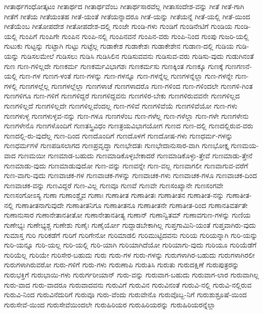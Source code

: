 {ಗೀತಾರ್ಥಗಂಧೋತ್ಕಟಂ
ಗೀತಾರ್ಥದ
ಗೀತಾರ್ಥವೆಂಬ
ಗೀತಾರ್ಥಸಾರವೆಲ್ಲ
ಗೀತಾಸಂದೇಶ-ವನ್ನು
ಗೀತೆ
ಗೀತೆ-ಗಾಗಿ
ಗೀತೆಗೆ
ಗೀತೆಯ
ಗೀತೆಯಂತಹ
ಗೀತೆ-ಯಂತೆ
ಗೀತೆಯನ್ನಾದರೂ
ಗೀತೆ-ಯನ್ನು
ಗೀತೆಯನ್ನೆ
ಗೀತೆ-ಯಲ್ಲಿ
ಗೀತೆ-ಯಿಂದ
ಗೀತೆಯೆಂಬ
ಗೀತೋಪದೇಶ
ಗೀತೋಪದೇಶ-ದಲ್ಲಿ
ಗುಂಜೇ
ಗುಂಡಿ-ಗಳು
ಗುಂಡಿಗೆ
ಗುಂಡಿನೇಟಿಗೆ
ಗುಂಡಿಯ
ಗುಂಡಿ-ಯಲ್ಲಿ
ಗುಂಪಿಗೆ
ಗುಂಪಿಗೇ
ಗುಂಪಿನ
ಗುಂಪಿ-ನಲ್ಲಿ
ಗುಂಪಿನವನೆ
ಗುಂಪಿನ-ವರು
ಗುಂಪಿ-ನಿಂದ
ಗುಂಪು
ಗುಜರಿ-ಯಲ್ಲಿ
ಗುಟುಕು
ಗುಟ್ಟನ್ನು
ಗುಟ್ಟಾಗಿ
ಗುಟ್ಟು
ಗುಟ್ಟೆಲ್ಲ
ಗುಡಾಕೇಶ
ಗುಡಾಕೇಶಃ
ಗುಡಾಕೇಶೇನ
ಗುಡಾಣ-ದಲ್ಲಿ
ಗುಡಿಯ
ಗುಡಿ-ಯನ್ನು
ಗುಡಿಸಲಮೇಲೆ
ಗುಡಿಸಲು
ಗುಡಿಸಿ
ಗುಡಿಸಿಲಿನ
ಗುಡಿಸುವವನು
ಗುಡಿಸುವ-ವರು
ಗುಡಿಸು-ವುದು
ಗುಡುಗಿನಂತೆ
ಗುಣ
ಗುಣ-ಗಳಿಲ್ಲದೇ
ಗುಣಕರ್ಮ
ಗುಣಕರ್ಮವಿಭಾಗಶಃ
ಗುಣಕರ್ಮಸು
ಗುಣಕ್ಕಿಂತ
ಗುಣಕ್ಕೂ
ಗುಣಕ್ಕೆ
ಗುಣಗಣನೆ-ಯಲ್ಲಿ
ಗುಣ-ಗಳ
ಗುಣಗ-ಳಂತೆ
ಗುಣ-ಗಳನ್ನು
ಗುಣ-ಗಳನ್ನೂ
ಗುಣ-ಗಳನ್ನೆಲ್ಲ
ಗುಣಗಳನ್ನೆಲ್ಲಾ
ಗುಣ-ಗಳನ್ನೇ
ಗುಣ-ಗಳಲ್ಲಿ
ಗುಣಗಳಲ್ಲೆಲ್ಲ
ಗುಣಗಳಲ್ಲೆಲ್ಲಾ
ಗುಣಗಳಾಚೆ
ಗುಣಗಳಾದರೊ
ಗುಣ-ಗಳಿಂದ
ಗುಣ-ಗಳಿಂದಲೇ
ಗುಣಗಳಿ-ಗಿಂತ
ಗುಣಗಳಿಗೂ
ಗುಣ-ಗಳಿಗೆ
ಗುಣಗಳಿದ್ದರೆ
ಗುಣಗಳಿದ್ದವನು
ಗುಣಗಳಿರ-ಬೇಕು
ಗುಣಗಳಿರುವವನೇ
ಗುಣಗಳಿಲ್ಲದ
ಗುಣಗಳಿಲ್ಲದೆ
ಗುಣಗಳಿಲ್ಲದೇ
ಗುಣಗಳಿಲ್ಲವೆಂದಲ್ಲ
ಗುಣ-ಗಳಿವೆ
ಗುಣಗಳಿವೆಯೆ
ಗುಣಗಳಿವೆಯೋ
ಗುಣ-ಗಳು
ಗುಣಗಳುಳ್ಳ
ಗುಣಗಳುಳ್ಳವ-ನನ್ನು
ಗುಣ-ಗಳೂ
ಗುಣಗಳೆಂಬ
ಗುಣ-ಗಳೆಲ್ಲ
ಗುಣ-ಗಳೆಲ್ಲಾ
ಗುಣ-ಗಳೇ
ಗುಣಗಳೇನು
ಗುಣಗಳೇನೊ
ಗುಣಗಳೊಂದಿಗೆ
ಗುಣತಸ್ತ್ರಿವಿಧಂ
ಗುಣತ್ರಯವಿಭಾಗಯೋಗ
ಗುಣದ
ಗುಣ-ದಲ್ಲಿ
ಗುಣದಲ್ಲಿರುವ-ವರು
ಗುಣದಲ್ಲಿ-ರು-ವುದೆಲ್ಲ
ಗುಣ-ದಿಂದ
ಗುಣದೊಂದಿಗೆ
ಗುಣದೊಳಗೆ
ಗುಣದೋಷ-ಗಳು
ಗುಣಧರ್ಮ-ಗಳನ್ನು
ಗುಣಧರ್ಮಗಳೆ
ಗುಣಪಡಿಸಲಾಗದ
ಗುಣಪ್ರವೃದ್ಧಾ
ಗುಣಭೇದತಃ
ಗುಣಭೇದಾನುಸಾರ-ವಾಗಿ
ಗುಣಭೋಕ್ತೃ
ಗುಣಮಯ-ವಾದ
ಗುಣಮಯೀ
ಗುಣಮಾಡ-ಬಹುದು
ಗುಣಮಾಡಿಕೊಳ್ಳಬೇಕಾದರೆ
ಗುಣಮಾಡಿಕೊಳ್ಳು-ತ್ತೇವೆ
ಗುಣಮಾಡು-ತ್ತೇನೆ
ಗುಣಮಾಡು-ವುದು
ಗುಣಮಾಡುವುದೋ
ಗುಣ-ವನ್ನು
ಗುಣವನ್ನೇ
ಗುಣ-ವಲ್ಲ
ಗುಣವಾಗಲೀ
ಗುಣವಾಗುವ-ವರೆಗೆ
ಗುಣ-ವಾಗು-ವುದು
ಗುಣವಾಚಕ-ಗಳ
ಗುಣವಾಚಕ-ಗಳನ್ನು
ಗುಣವಾಚಕ-ಗಳು
ಗುಣವಾಚಕ-ಗಳೂ
ಗುಣವಾಚಕ-ದಿಂದ
ಗುಣವಾಚಕ-ವನ್ನು
ಗುಣವಿದ್ದರೆ
ಗುಣ-ವಿಲ್ಲ
ಗುಣವೂ
ಗುಣವೆ
ಗುಣವೇ
ಗುಣಸಂಖ್ಯಾನೇ
ಗುಣಸಂಗವೇ
ಗುಣಸಂಗೋಽಸ್ಯ
ಗುಣಾ
ಗುಣಾಂಶ್ಚೈವ
ಗುಣಾಃ
ಗುಣಾತೀತ
ಗುಣಾತೀತಃ
ಗುಣಾತೀತನ
ಗುಣಾತೀತ-ನನ್ನು
ಗುಣಾತೀತ-ನಲ್ಲಿ
ಗುಣಾತೀತನಾಗುವುದೇ
ಗುಣಾತೀತನಿಗೂ
ಗುಣಾತೀತನೂ
ಗುಣಾತೀತನೇ
ಗುಣಾತೀತ-ರಿಂದ
ಗುಣಾನತಿವರ್ತತೇ
ಗುಣಾನುಸಾರ
ಗುಣಾನೇತಾನತೀತೋ
ಗುಣಾನೇತಾನತೀತ್ಯ
ಗುಣಾನ್
ಗುಣಾನ್ವಿತಮ್
ಗುಣಾವಗುಣ-ಗಳನ್ನು
ಗುಣಿಯ
ಗುಣೇಭ್ಯಃ
ಗುಣೇಭ್ಯಶ್ಚ
ಗುಣೇಶು
ಗುಣೈಃ
ಗುಣೈರ್ಯೋ
ಗುದ್ದಾಡಬೇಕಾಗಿಲ್ಲ
ಗುಪ್ತಗಾಮಿನಿ-ಯಂತೆ
ಗುಪ್ತವಾಗಿರು-ವುದು
ಗುಮಾಸ್ತ
ಗುರಿ
ಗುರಿಕಡೆಗೆ
ಗುರಿಗೆ
ಗುರಿಗೇನೋ
ಗುರಿಮಾಡಲಿ
ಗುರಿಮುಟ್ಟಿದವನು
ಗುರಿಯ
ಗುರಿಯನ್ನಾಗಿ
ಗುರಿ-ಯನ್ನು
ಗುರಿ-ಯನ್ನೂ
ಗುರಿ-ಯಲ್ಲ
ಗುರಿ-ಯಲ್ಲಿ
ಗುರಿ-ಯಾಗಿ
ಗುರಿಯಾಗಿದೆಯೋ
ಗುರಿಯಾಗು-ವುದು
ಗುರಿಯೂ
ಗುರಿಯೆಡೆಗೆ
ಗುರಿಯೆಲ್ಲ
ಗುರಿಯೇ
ಗುರಿಸೇರ-ಬಹುದು
ಗುರು
ಗುರು-ಗಳ
ಗುರು-ಗಳನ್ನು
ಗುರುಗಳಾಗಿರ-ಬಹುದು
ಗುರುಗಳಾಗಿರಲೀ
ಗುರುಗಳಾಗಿರುವರೋ
ಗುರು-ಗಳಿಗೆ
ಗುರು-ಗಳು
ಗುರುಣಾಪಿ
ಗುರುತಿಸಿ
ಗುರುತು
ಗುರುದಕ್ಷಿಣೆ
ಗುರುಪುತ್ರರನ್ನು
ಗುರುಭಕ್ತಿಗೆ
ಗುರುಭಾಯಿ-ಗಳು
ಗುರುರ್ಗರೀಯಾನ್
ಗುರು-ವನ್ನು
ಗುರುವಾಗ-ಬಹುದು
ಗುರುವಾಗ-ಲಾರ
ಗುರುವಾಗಿಲ್ಲ
ಗುರು-ವಾದ
ಗುರು-ವಾದರೂ
ಗುರುವಾದವನು
ಗುರುವಿಗೆ
ಗುರುವಿನ
ಗುರುವಿನಂತೆ
ಗುರುವಿ-ನಲ್ಲಿ
ಗುರುವಿ-ನಲ್ಲಿರುವ
ಗುರುವಿ-ನಿಂದ
ಗುರುವಿನೆದುರಿಗೆ
ಗುರುವೂ
ಗುರು-ವೆಂದು
ಗುರುವೇನೊ
ಗುರುವೊಬ್ಬ-ನಿಗೆ
ಗುರುಶುಶ್ರೂಷೆ-ಯಿಂದ
ಗುರುಸೇವೆ-ಯಿಂದ
ಗುರುಸೇವೆಯಿಂದಲೇ
ಗುರುಹಿರಿಯರ
ಗುರುಹಿರಿಯರನ್ನು
ಗುರುಹಿರಿಯರನ್ನೆಲ್ಲಾ
}
